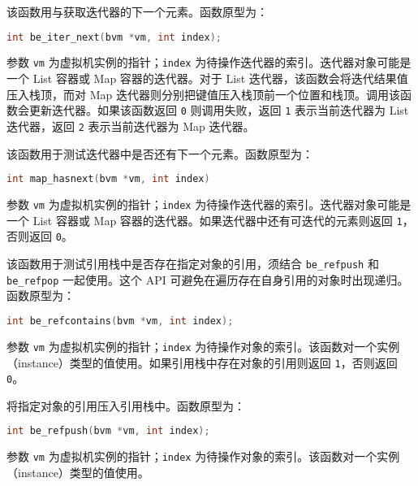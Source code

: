
该函数用与获取迭代器的下一个元素。函数原型为：
\begin{lstlisting}[language=c, style=berry, numbers=none]
int be_iter_next(bvm *vm, int index);
\end{lstlisting}
参数 \texttt{vm} 为虚拟机实例的指针；\texttt{index} 为待操作迭代器的索引。迭代器对象可能是一个 List 容器或 Map 容器的迭代器。对于 List 迭代器，该函数会将迭代结果值压入栈顶，而对 Map 迭代器则分别把键值压入栈顶前一个位置和栈顶。调用该函数会更新迭代器。如果该函数返回 \texttt{0} 则调用失败，返回 \texttt{1} 表示当前迭代器为 List 迭代器，返回 \texttt{2} 表示当前迭代器为 Map 迭代器。


该函数用于测试迭代器中是否还有下一个元素。函数原型为：
\begin{lstlisting}[language=c, style=berry, numbers=none]
int map_hasnext(bvm *vm, int index)
\end{lstlisting}
参数 \texttt{vm} 为虚拟机实例的指针；\texttt{index} 为待操作迭代器的索引。迭代器对象可能是一个 List 容器或 Map 容器的迭代器。如果迭代器中还有可迭代的元素则返回 \texttt{1}，否则返回 \texttt{0}。


该函数用于测试引用栈中是否存在指定对象的引用，须结合 \texttt{be\_refpush} 和 \texttt{be\_refpop} 一起使用。这个 API 可避免在遍历存在自身引用的对象时出现递归。函数原型为：
\begin{lstlisting}[language=c, style=berry, numbers=none]
int be_refcontains(bvm *vm, int index);
\end{lstlisting}
参数 \texttt{vm} 为虚拟机实例的指针；\texttt{index} 为待操作对象的索引。该函数对一个实例（instance）类型的值使用。如果引用栈中存在对象的引用则返回 \texttt{1}，否则返回 \texttt{0}。


将指定对象的引用压入引用栈中。函数原型为：
\begin{lstlisting}[language=c, style=berry, numbers=none]
int be_refpush(bvm *vm, int index);
\end{lstlisting}
参数 \texttt{vm} 为虚拟机实例的指针；\texttt{index} 为待操作对象的索引。该函数对一个实例（instance）类型的值使用。



